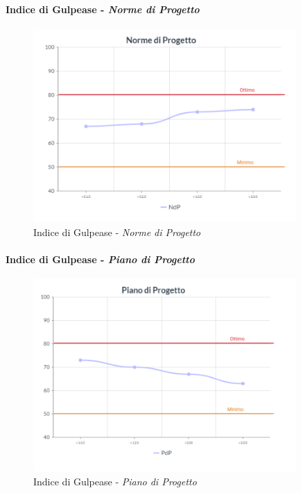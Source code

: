 \paragraph{Indice di Gulpease - \textit{Norme di Progetto}}
\begin{center}
\begin{figure}[H]
  \centering
  \renewcommand{\thefigure}{15}
  \includegraphics[width=10cm]{./res/images/NdPGraph.png}
  \caption{Indice di Gulpease - \textit{Norme di Progetto}}
  \label{fig:Indice di Gulpease - Norme di Progetto}
\end{figure}
\end{center}
\paragraph{Indice di Gulpease - \textit{Piano di Progetto}}
\begin{center}
\begin{figure}[H]
  \centering
  \renewcommand{\thefigure}{16}
  \includegraphics[width=10cm]{./res/images/PdPGraph.png}
  \caption{Indice di Gulpease - \textit{Piano di Progetto}}
  \label{fig:Indice di Gulpease - Piano di Progetto}
\end{figure}
\end{center}
